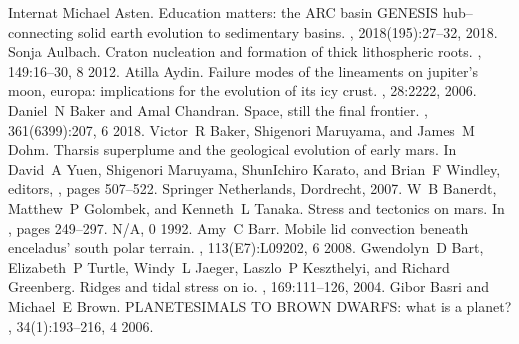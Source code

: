\documentclass[letterpaper,10pt,english]{jupyterBook}
\begin{document}
\begin{sphinxthebibliography}{Internat}
\sphinxAtStartPar
Michael Asten. Education matters: the ARC basin GENESIS hub–connecting solid earth evolution to sedimentary basins. , 2018(195):27–32, 2018.
\sphinxAtStartPar
Sonja Aulbach. Craton nucleation and formation of thick lithospheric roots. , 149:16–30, 8 2012.
\sphinxAtStartPar
Atilla Aydin. Failure modes of the lineaments on jupiter's moon, europa: implications for the evolution of its icy crust. , 28:2222, 2006.
\sphinxAtStartPar
Daniel N Baker and Amal Chandran. Space, still the final frontier. , 361(6399):207, 6 2018.
\sphinxAtStartPar
Victor R Baker, Shigenori Maruyama, and James M Dohm. Tharsis superplume and the geological evolution of early mars. In David A Yuen, Shigenori Maruyama, Shun\sphinxhyphen{}Ichiro Karato, and Brian F Windley, editors, , pages 507–522. Springer Netherlands, Dordrecht, 2007.
\sphinxAtStartPar
W B Banerdt, Matthew P Golombek, and Kenneth L Tanaka. Stress and tectonics on mars. In , pages 249–297. N/A, 0 1992.
\sphinxAtStartPar
Amy C Barr. Mobile lid convection beneath enceladus' south polar terrain. , 113(E7):L09202, 6 2008.
\sphinxAtStartPar
Gwendolyn D Bart, Elizabeth P Turtle, Windy L Jaeger, Laszlo P Keszthelyi, and Richard Greenberg. Ridges and tidal stress on io. , 169:111–126, 2004.
\sphinxAtStartPar
Gibor Basri and Michael E Brown. PLANETESIMALS TO BROWN DWARFS: what is a planet? , 34(1):193–216, 4 2006.
\sphinxAtStartPar

\end{sphinxthebibliography}
\end{document}
